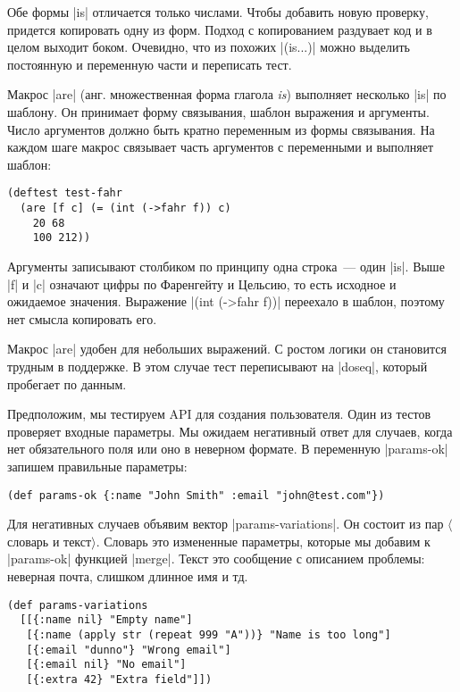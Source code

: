 Обе формы \spverb|is| отличается только числами. Чтобы добавить новую проверку,
придется копировать одну из форм. Подход с копированием раздувает код и в целом
выходит боком. Очевидно, что из похожих \spverb|(is...)| можно выделить
постоянную и переменную части и переписать тест.

Макрос \spverb|are| (анг. множественная форма глагола \emph{is}) выполняет
несколько \spverb|is| по шаблону. Он принимает форму связывания, шаблон
выражения и аргументы. Число аргументов должно быть кратно переменным из формы
связывания. На каждом шаге макрос связывает часть аргументов с переменными и
выполняет шаблон:

\begin{verbatim}
(deftest test-fahr
  (are [f c] (= (int (->fahr f)) c)
    20 68
    100 212))
\end{verbatim}

Аргументы записывают столбиком по принципу одна строка~--- один
\spverb|is|. Выше \spverb|f| и \spverb|c| означают цифры по Фаренгейту и
Цельсию, то есть исходное и ожидаемое значения. Выражение \spverb|(int (->fahr f))|
переехало в шаблон, поэтому нет смысла копировать его.

Макрос \spverb|are| удобен для небольших выражений. С ростом логики он
становится трудным в поддержке. В этом случае тест переписывают на
\spverb|doseq|, который пробегает по данным.

Предположим, мы тестируем API для создания пользователя. Один из тестов
проверяет входные параметры. Мы ожидаем негативный ответ для случаев, когда нет
обязательного поля или оно в неверном формате. В переменную \spverb|params-ok|
запишем правильные параметры:

\begin{verbatim}
(def params-ok {:name "John Smith" :email "john@test.com"})
\end{verbatim}

Для негативных случаев объявим вектор \spverb|params-variations|. Он состоит из
пар $\langle$словарь и текст$\rangle$. Словарь это измененные параметры, которые
мы добавим к \spverb|params-ok| функцией \spverb|merge|. Текст это сообщение с
описанием проблемы: неверная почта, слишком длинное имя и тд.

\begin{verbatim}
(def params-variations
  [[{:name nil} "Empty name"]
   [{:name (apply str (repeat 999 "A"))} "Name is too long"]
   [{:email "dunno"} "Wrong email"]
   [{:email nil} "No email"]
   [{:extra 42} "Extra field"]])
\end{verbatim}


